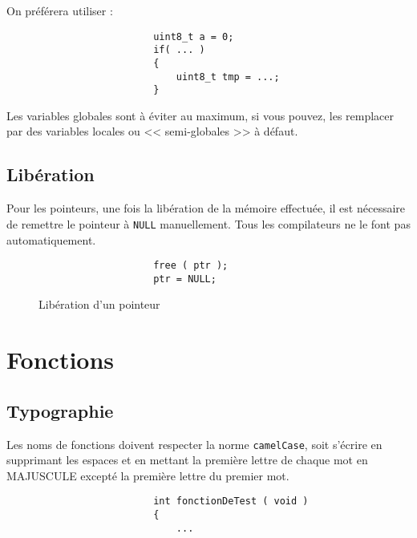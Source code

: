 			On préférera utiliser : 

			\begin{figure}[H]
				\begin{changemargin}{-2.5cm}{-2.5cm}
				\begin{tcolorbox}
				\begin{verbatim}
					uint8_t a = 0;
					if( ... )
					{
						uint8_t tmp = ...;
					}
				\end{verbatim}
				\end{tcolorbox}
				\end{changemargin}
			\end{figure}

			Les variables globales sont à éviter au maximum, si vous pouvez, les remplacer par des variables locales ou << semi-globales >> à défaut.

		\subsection{Libération}
			Pour les pointeurs, une fois la libération de la mémoire effectuée, il est nécessaire de remettre le pointeur à \verb+NULL+ manuellement. Tous les compilateurs ne le font pas automatiquement.

			\begin{figure}[H]
				\begin{changemargin}{-2.5cm}{-2.5cm}
				\begin{tcolorbox}
				\begin{verbatim}
					free ( ptr );
					ptr = NULL;
				\end{verbatim}
				\end{tcolorbox}
				\end{changemargin}
				\caption{Libération d'un pointeur}
			\end{figure}

	\section{Fonctions}
		\subsection{Typographie}
			Les noms de fonctions doivent respecter la norme \verb+camelCase+, soit s'écrire en supprimant les espaces et en mettant la première lettre de chaque mot en MAJUSCULE excepté la première lettre du premier mot.

			\begin{figure}[H]
				\begin{changemargin}{-2.5cm}{-2.5cm}
				\begin{tcolorbox}
				\begin{verbatim}
					int fonctionDeTest ( void )
					{
					    ...
				\end{verbatim}
				\end{tcolorbox}
				\end{changemargin}
			\end{figure}

